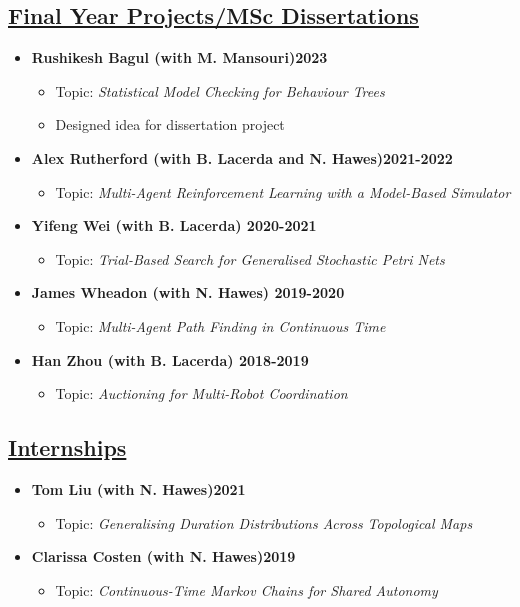 \documentclass[11pt]{article}
\begin{document}
\subsection*{\underline{Final Year Projects/MSc Dissertations}}
\begin{itemize}
\item \textbf{Rushikesh Bagul (with M. Mansouri)\hfill 2023}
\begin{itemize}
\item Topic: \emph{Statistical Model Checking for Behaviour Trees}
\item Designed idea for dissertation project
\end{itemize}
\item \textbf{Alex Rutherford (with B. Lacerda and N. Hawes)\hfill 2021-2022}
\begin{itemize}
\item Topic: \emph{Multi-Agent Reinforcement Learning with a Model-Based Simulator}
\end{itemize}
\item \textbf{Yifeng Wei (with B. Lacerda) \hfill 2020-2021}
\begin{itemize}
\item Topic: \emph{Trial-Based Search for Generalised Stochastic Petri Nets}
\end{itemize} 
\item \textbf{James Wheadon (with N. Hawes) \hfill 2019-2020}
\begin{itemize}
\item  Topic: \emph{Multi-Agent Path Finding in Continuous Time}
\end{itemize}
\item \textbf{Han Zhou (with B. Lacerda) \hfill 2018-2019}
\begin{itemize}
\item Topic: \emph{Auctioning for Multi-Robot Coordination}
\end{itemize}
\end{itemize}

\subsection*{\underline{Internships}}	
\begin{itemize}
\item \textbf{Tom Liu (with N. Hawes)\hfill 2021}
\begin{itemize}
\item Topic: \emph{Generalising Duration Distributions Across Topological Maps}
\end{itemize}
\item \textbf{Clarissa Costen (with N. Hawes)\hfill 2019}
\begin{itemize}
\item Topic: \emph{Continuous-Time Markov Chains for Shared Autonomy}
\end{itemize}
\end{itemize}
\end{document}
